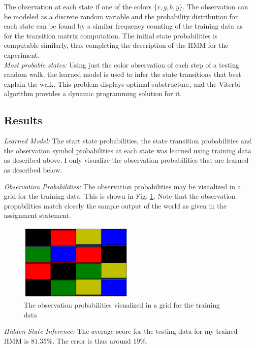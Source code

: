 \documentclass[5pt]{article}
\begin{document}
The observation at each state if one of the colors $\{r, g, b, y\}$. The
observation can be modeled as a discrete random variable and the probability
distribution for each state can be found by a similar frequency counting of the
training data as for the transition matrix computation. The initial state
probabilities is computable similarly, thus completing the description of the
HMM for the experiment. \\

\noindent \emph{Most probable states:} Using just the color observation of
each step of a testing random walk, the learned model is used to infer the
state transitions that best explain the walk. This problem displays optimal
substructure, and the Viterbi algorithm provides a dynamic programming solution
for it.

\subsection{Results}

\noindent \emph{Learned Model:} The start state probabilities, the state
transition probabilities and the observation symbol probabilities at each state
was learned using training data as described above. I only visualize the
observation probabilities that are learned as described below.

\noindent \emph{Observation Probabilities:} The observation probabilities may
be visualized in a grid for the training data. This is shown in Fig.
\ref{fig:observationP}. Note that the observation propabilities match closely
the sample output of the world as given in the assignment statement. \\

\begin{figure}[h]
  \center{}
  \includegraphics[width=0.5\textwidth]{images/observationP.png}
\caption{The observation probabilities visualized in a grid for the training
data}
\label{fig:observationP}
\end{figure}

\noindent \emph{Hidden State Inference:} The average score for the testing data
for my trained HMM is $81.35\%$. The error is thus around $19\%$.
\end{document}
